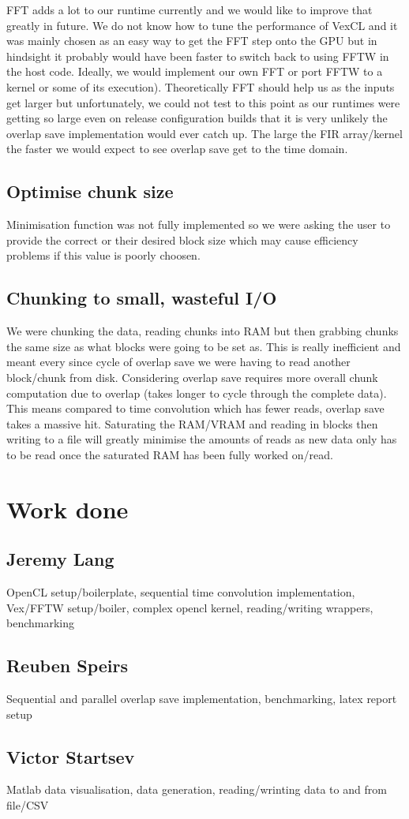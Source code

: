 \documentclass{article}
\begin{document}
FFT adds a lot to our runtime currently and we would like to improve that greatly in future. We do not know how to tune the performance of VexCL and it was mainly chosen as an easy way to get the FFT step onto the GPU but in hindsight it probably would have been faster to switch back to using FFTW in the host code. Ideally, we would implement our own FFT or port FFTW to a kernel or some of its execution).  Theoretically FFT should help us as the inputs get larger but unfortunately, we could not test to this point as our runtimes were getting so large even on release configuration builds that it is very unlikely the overlap save implementation would ever catch up. The large the FIR array/kernel the faster we would expect to see overlap save get to the time domain.

\subsection{Optimise chunk size}

Minimisation function was not fully implemented so we were asking the user to provide the correct or their desired block size which may cause efficiency problems if this value is poorly choosen.

\subsection{Chunking to small, wasteful I/O}

We were chunking the data, reading chunks into RAM but then grabbing chunks the same size as what blocks were going to be set as. This is really inefficient and meant every since cycle of overlap save we were having to read another block/chunk from disk. Considering overlap save requires more overall chunk computation due to overlap (takes longer to cycle through the complete data). This means compared to time convolution which has fewer reads, overlap save takes a massive hit. Saturating the RAM/VRAM and reading in blocks then writing to a file will greatly minimise the amounts of reads as new data only has to be read once the saturated RAM has been fully worked on/read.

\section{Work done}

\subsection{Jeremy Lang}
OpenCL setup/boilerplate, sequential time convolution implementation, Vex/FFTW setup/boiler, complex opencl kernel, reading/writing wrappers, benchmarking

\subsection{Reuben Speirs}
Sequential and parallel overlap save implementation, benchmarking, latex report setup

\subsection{Victor Startsev}
Matlab data visualisation, data generation, reading/wrinting data to and from file/CSV



\nocite{*}
\end{document}
